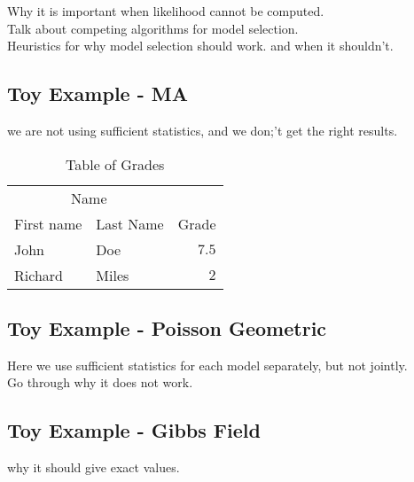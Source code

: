 \documentclass[fleqn,10pt]{SelfArx} %
\begin{document}
Why it is important when likelihood cannot be computed.\\
Talk about competing algorithms for model selection. \\
Heuristics for why model selection should work. and when it shouldn't.\\


\subsection{Toy Example - MA}
 we are not using sufficient statistics, and we don;'t get the right results.

\begin{table}[hbt]
\caption{Table of Grades}
\centering
\begin{tabular}{llr}
\toprule
\multicolumn{2}{c}{Name} \\
\cmidrule(r){1-2}
First name & Last Name & Grade \\
\midrule
John & Doe & $7.5$ \\
Richard & Miles & $2$ \\
\bottomrule
\end{tabular}
\label{tab:label}
\end{table}

\subsection{Toy Example - Poisson Geometric}
Here we use sufficient statistics for each model separately, but not jointly.\\
Go through why it does not work.\\

\subsection{Toy Example - Gibbs Field}
why it should give exact values. \\








\end{document}
